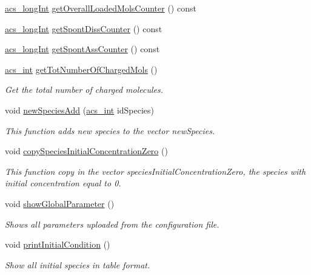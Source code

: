 \begin{DoxyCompactItemize}
\item 
\hyperlink{a00024_a19319d75f02db4308bc5c0026d98cd85}{acs\-\_\-long\-Int} \hyperlink{a00011_a75329459280bc79537a5c08883449a63}{get\-Overall\-Loaded\-Mols\-Counter} () const 
\item 
\hyperlink{a00024_a19319d75f02db4308bc5c0026d98cd85}{acs\-\_\-long\-Int} \hyperlink{a00011_a914378e80f148a4b24fc8e27ebb02198}{get\-Spont\-Diss\-Counter} () const 
\item 
\hyperlink{a00024_a19319d75f02db4308bc5c0026d98cd85}{acs\-\_\-long\-Int} \hyperlink{a00011_ab3c423ac69aac398c087cde1dcb0dccb}{get\-Spont\-Ass\-Counter} () const 
\item 
\hyperlink{a00024_a8d277355641a098190360234e2ebde35}{acs\-\_\-int} \hyperlink{a00011_aadb5c442d5c9d16a0d6b2e90715dda94}{get\-Tot\-Number\-Of\-Charged\-Mols} ()
\begin{DoxyCompactList}\small\item\em Get the total number of charged molecules. \end{DoxyCompactList}\item 
void \hyperlink{a00011_a4721ebd79c1f52a583fd60ff8f2ece2c}{new\-Species\-Add} (\hyperlink{a00024_a8d277355641a098190360234e2ebde35}{acs\-\_\-int} id\-Species)
\begin{DoxyCompactList}\small\item\em This function adds new species to the vector new\-Species. \end{DoxyCompactList}\item 
void \hyperlink{a00011_a375fc2dc0afc38a8a3afbd016acc4983}{copy\-Species\-Initial\-Concentration\-Zero} ()
\begin{DoxyCompactList}\small\item\em This function copy in the vector species\-Initial\-Concentration\-Zero, the species with initial concentration equal to 0. \end{DoxyCompactList}\item 
void \hyperlink{a00011_af959a6b6a72cb6226fef7f0e7fab5c0c}{show\-Global\-Parameter} ()
\begin{DoxyCompactList}\small\item\em Shows all parameters uploaded from the configuration file. \end{DoxyCompactList}\item 
void \hyperlink{a00011_a429c2529badaeda72e553f500b990e11}{print\-Initial\-Condition} ()
\begin{DoxyCompactList}\small\item\em Show all initial species in table format. \end{DoxyCompactList}\item 

\end{DoxyCompactItemize}
